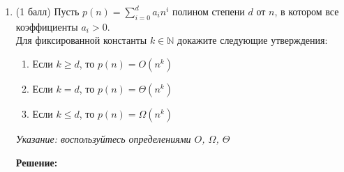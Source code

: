 \documentclass[11pt,russian]{amsart}
\newcommand{\N}{\mathbb{N}}
\newcommand{\1}{\mathbb{1}}
\begin{document}
\begin{enumerate}[label={\arabic*.}]
		Корректность алгоритма следует из того, что на каждой итерации упорядоченный префикс растет хотя бы на один элемент
		
		c) Если мы хотим, чтобы перестановки были во всех итерациях внешнего цикла, то надо взять отсортированный массив по возрастанию.
		
		Пример на Python:
		
		\begin{verbatim}
		def inv_bubble_sort(arr):
			n = len(arr)
			swap_count = 0
			for i in range(n - 1, 0, -1):
				for j in range(n - 1, 0, -1):
					if arr[j - 1] < arr[j]:
						swap_count += 1
						arr[j - 1], arr[j] = arr[j], arr[j - 1]
			return arr, swap_count

		arr = [1, 2, 3, 4, 5]
		arr, c = inv_bubble_sort(arr)
		arr, c  # >> ([5, 4, 3, 2, 1], 10)
		\end{verbatim}
				
		Всего таких перестановок может быть $\frac{n(n-1)}{2}$ 
		\begin{verbatim}
			(len(arr)*(len(arr)-1))/2 
			>> 10.0
		\end{verbatim}
		
		Других не может быть потому, что это максимальное возможное число перестановок. Если брать другой массив, то их просто на просто станет меньше\\
		
		
		\item (1 балл) Пусть $p(n) = \sum\limits_{i=0}^{d} a_i n^i$ полином степени $d$ от $n$, в котором все коэффициенты $a_i > 0$.\\ Для фиксированной константы $k \in \N$ докажите следующие утверждения:
		
		\begin{enumerate}
			\item Если $k \geq d$, то $p(n) = O(n^k)$
			\item Если $k = d$, то $p(n) = \Theta(n^k)$
			\item Если $k \leq d$, то $p(n) = \Omega(n^k)$
		\end{enumerate}
		
		\textit{Указание: воспользуйтесь определениями $O$, $\Omega$, $\Theta$}

		\textbf{Решение:}


\end{enumerate}
\end{document}
